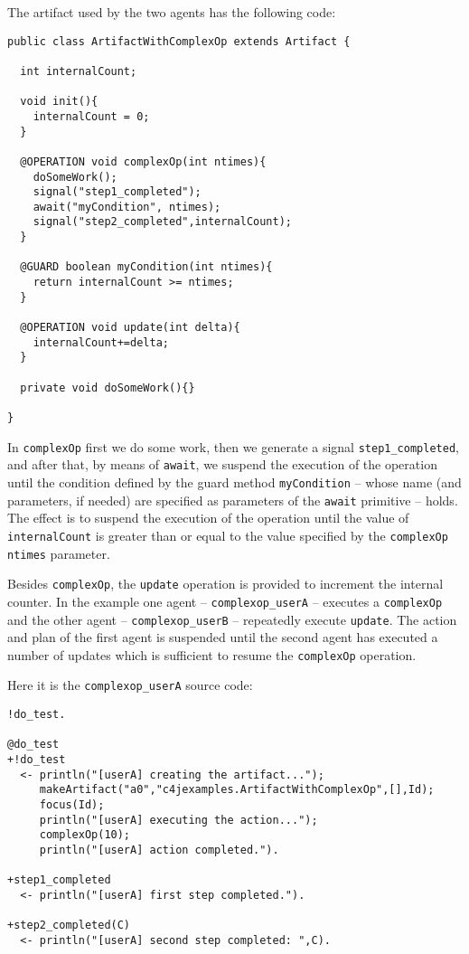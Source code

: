\documentclass[11pt]{report}
\newcommand\code[1]{{\small{\mbox{\texttt{{#1}}}}}}
\begin{document}
\noindent The artifact used by the two agents has the following code: 
%
{\small{
\begin{verbatim}
public class ArtifactWithComplexOp extends Artifact {
	
  int internalCount;

  void init(){
    internalCount = 0;
  }
	
  @OPERATION void complexOp(int ntimes){
    doSomeWork();
    signal("step1_completed");
    await("myCondition", ntimes);
    signal("step2_completed",internalCount);
  }
	
  @GUARD boolean myCondition(int ntimes){
    return internalCount >= ntimes;
  }
	
  @OPERATION void update(int delta){
    internalCount+=delta;
  }
  
  private void doSomeWork(){}
  
}
\end{verbatim}}}
%
\noindent In \code{complexOp} first we do some work, then we generate a signal \code{step1\_completed}, and after that, by means of \code{await}, we suspend the execution of the operation until the condition defined by the  guard method \code{myCondition} --  whose name (and parameters, if needed) are specified as parameters of the \code{await} primitive -- holds.
%
The effect is to suspend the execution of the operation until the value of \code{internalCount} is greater than or equal to the value specified by the \code{complexOp} \code{ntimes} parameter.
%

Besides \code{complexOp}, the \code{update} operation is provided to increment the internal counter.
%
In the example one agent -- \code{complexop\_userA} -- executes a \code{complexOp} and the other agent -- \code{complexop\_userB} -- repeatedly execute \code{update}.
%
The action and plan of the first agent is suspended until the second agent has executed a number of updates which is sufficient to resume the \code{complexOp} operation.

\noindent Here it is the \code{complexop\_userA} source code:
%
{\small{\begin{verbatim}
!do_test.

@do_test
+!do_test     
  <- println("[userA] creating the artifact...");
     makeArtifact("a0","c4jexamples.ArtifactWithComplexOp",[],Id);
     focus(Id);
     println("[userA] executing the action...");
     complexOp(10);
     println("[userA] action completed."). 

+step1_completed
  <- println("[userA] first step completed.").

+step2_completed(C)
  <- println("[userA] second step completed: ",C).
\end{verbatim}}}
\end{document}
